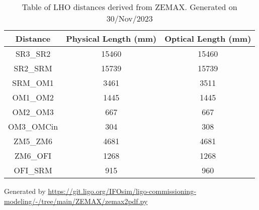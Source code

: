 \documentclass{article}
\begin{document}
\begin{table}[h!] 
\centering  
\begin{tabular}{| c| c | c |} 
\hline \bf{Distance} & \bf{Physical Length (mm)} & \bf{Optical Length (mm)} \\ \hline 
SR3\_SR2 & 15460 & 15460 \\ 
SR2\_SRM & 15739 & 15739 \\ 
SRM\_OM1 & 3461 & 3511 \\ 
OM1\_OM2 & 1445 & 1445 \\ 
OM2\_OM3 & 667 & 667 \\ 
OM3\_OMCin & 304 & 308 \\ 
ZM5\_ZM6 & 4681 & 4681 \\ 
ZM6\_OFI & 1268 & 1268 \\ 
OFI\_SRM & 915 & 960 \\ 
\hline 
\end{tabular} 
\caption{Table of LHO distances derived from ZEMAX. Generated on 30/Nov/2023}
\end{table} 


 Generated by \url{https://git.ligo.org/IFOsim/ligo-commissioning-modeling/-/tree/main/ZEMAX/zemax2pdf.py}
\end{document}
